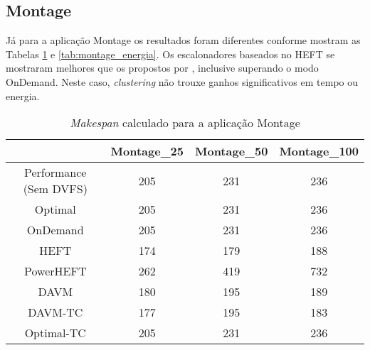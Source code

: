 \subsection{Montage} %
\label{sub:montage}

Já para a aplicação Montage os resultados foram diferentes conforme mostram as
Tabelas \ref{tab:montage_tempo} e \ref{tab:montage_energia}. Os escalonadores
baseados no HEFT se mostraram melhores que os propostos por
\cite{guerout:energy_aware_simulation}, inclusive superando o modo OnDemand.
Neste caso, \emph{clustering} não trouxe ganhos significativos em tempo ou
energia.

\begin{table}
	\centering
    \begin{tabular}{c|ccc}
    ~                    & Montage\_25 & Montage\_50 & Montage\_100 \\ \hline
    Performance (Sem DVFS) & 205        & 231        & 236         \\
    \cite{guerout:energy_aware_simulation} Optimal      & 205        & 231        & 236         \\
    \cite{guerout:energy_aware_simulation} OnDemand     & 205        & 231        & 236         \\
    HEFT                   & 174        & 179        & 188         \\
    PowerHEFT              & 262        & 419        & 732         \\
    DAVM                   & 180        & 195        & 189         \\
    DAVM-TC                & 177        & 195        & 183         \\
    Optimal-TC             & 205        & 231        & 236         \\
    \end{tabular}
    \caption{\emph{Makespan} calculado para a aplicação Montage}
    \label{tab:montage_tempo}
\end{table}



